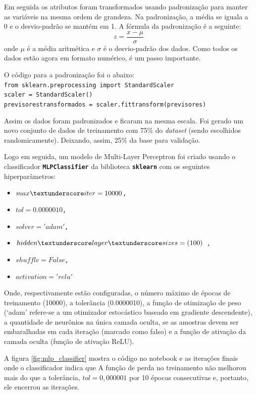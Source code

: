 Em seguida os atributos foram transformados usando padronização para manter as variáveis na mesma ordem de grandeza. Na padronização, a média se iguala a 0 e o desvio-padrão se mantém em 1. A fórmula da padronização é a seguinte:
\begin{equation}\label{padronizacao}
	z = \frac{x - \mu}{\sigma}
\end{equation}
onde $\mu$ é a média aritmética e $\sigma$ é o desvio-padrão dos dados. Como todos os dados estão agora em formato numérico, é um passo importante.

O código para a padronização foi o abaixo:\\
\noident
\texttt{from sklearn.preprocessing import StandardScaler \\
scaler = StandardScaler() \\
previsores\textunderscore transformados = scaler.fit\textunderscore transform(previsores)}

Assim os dados foram padronizados e ficaram na mesma escala. Foi gerado um novo conjunto de dados de treinamento com 75\% do \textit{dataset} (sendo escolhidos randomicamente). Deixando, assim, 25\% da base para validação.

Logo em seguida, um modelo de Multi-Layer Perceptron foi criado usando o classificador \texttt{\textbf{MLPClassifier}} da biblioteca \texttt{\textbf{sklearn}} com os seguintes hiperparâmetros: 
\begin{itemize}
	\item \texttt{$max\textunderscore iter=10000$,}
	\item \texttt{$tol = 0.0000010$,}
	\item \texttt{$solver = 'adam'$,}
	\item \texttt{$hidden\textunderscore layer\textunderscore sizes=(100)$ ,}
	\item \texttt{$shuffle=False$,}
	\item \texttt{$activation='relu'$}
\end{itemize}

Onde, respectivamente estão configuradas, o número máximo de épocas de treinamento (10000), a tolerância (0.0000010), a função de otimização de peso (`adam' refere-se a um otimizador estocástico baseado em gradiente descendente), a quantidade de neurônios na única camada oculta, se as amostras devem ser embaralhadas em cada iteração (marcado como falso) e a função de ativação da camada oculta (função de ativação ReLU).

A figura \ref{fig:mlp_classifier} mostra o código no notebook e as iterações finais onde o classificador indica que A função de perda no treinamento não melhorou mais do que a tolerância, $tol = 0,000001$ por 10 épocas consecutivas e, portanto, ele encerrou as iterações.

